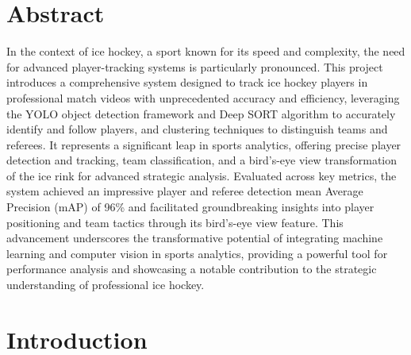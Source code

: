\documentclass[12pt, letterpaper]{article}
\begin{document}
\section*{\Huge Abstract}
\begin{spacing}{1.3}
In the context of ice hockey, a sport known for its speed and complexity, the need for advanced player-tracking systems is particularly pronounced. This project introduces a comprehensive system designed to track ice hockey players in professional match videos with unprecedented accuracy and efficiency, leveraging the YOLO object detection framework and Deep SORT algorithm to accurately identify and follow players, and clustering techniques to distinguish teams and referees. It represents a significant leap in sports analytics, offering precise player detection and tracking, team classification, and a bird's-eye view transformation of the ice rink for advanced strategic analysis. Evaluated across key metrics, the system achieved an impressive player and referee detection mean Average Precision (mAP) of 96\% and facilitated groundbreaking insights into player positioning and team tactics through its bird's-eye view feature. This advancement underscores the transformative potential of integrating machine learning and computer vision in sports analytics, providing a powerful tool for performance analysis and showcasing a notable contribution to the strategic understanding of professional ice hockey.
\end{spacing}
\newpage



\section{Introduction}
\end{document}
